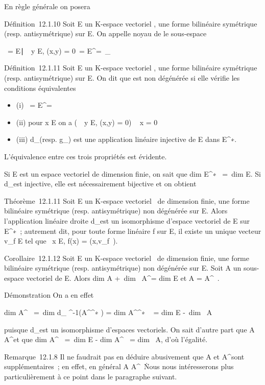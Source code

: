 \documentclass[]{article}
\begin{document}
En règle générale on posera

Définition~12.1.10 Soit E un K-espace vectoriel , \phi une forme bilinéaire
symétrique (resp. antisymétrique) sur E. On appelle noyau de \phi le
sous-espace

\mathrmKer~\phi =
\x \in
E∣\forall~~y \in E, \phi(x,y) =
0\ = E^\bot =\
\mathrmKerd_ \phi

Définition~12.1.11 Soit E un K-espace vectoriel , \phi une forme bilinéaire
symétrique (resp. antisymétrique) sur E. On dit que \phi est non dégénérée
si elle vérifie les conditions équivalentes

\begin{itemize}
\itemsep1pt\parskip0pt
\item
  (i) \mathrmKer~\phi =
  E^\bot = \0\
\item
  (ii) pour x \in E on a \left
  (\forall~~y \in E, \phi(x,y) = 0\right ) \rigtharrow~
  x = 0
\item
  (iii) d_\phi (resp. g_\phi) est une application linéaire
  injective de E dans E^∗.
\end{itemize}

L'équivalence entre ces trois propriétés est évidente.

Si E est un espace vectoriel de dimension finie, on sait que
dim E^∗~ =\
dim E. Si d_\phi est injective, elle est nécessairement
bijective et on obtient

Théorème~12.1.11 Soit E un K-espace vectoriel ~de dimension finie, \phi une
forme bilinéaire symétrique (resp. antisymétrique) non dégénérée sur E.
Alors l'application linéaire droite d_\phi est un isomorphisme
d'espace vectoriel de E sur E^∗~; autrement dit, pour toute
forme linéaire f sur E, il existe un unique vecteur v_f \in E tel
que \forall~x \in E, f(x) = \phi(x,v_f~).

Corollaire~12.1.12 Soit E un K-espace vectoriel ~de dimension finie, \phi
une forme bilinéaire symétrique (resp. antisymétrique) non dégénérée sur
E. Soit A un sous-espace vectoriel de E. Alors
dim A +\ dim~
A^\bot = dim E et A = A^\bot\bot~.

Démonstration On a en effet

dim A^\bot~ =\
dim d_ \phi^-1(A^\bot^∗ )
= dim A^\bot^∗ ~
= dim E -\ dim~ A

puisque d_\phi est un isomorphisme d'espaces vectoriels. On sait
d'autre part que A \subset~ A^\bot\bot et que
dim A^\bot\bot~ =\
dim E - dim A^\bot~
= dim~ A, d'où l'égalité.

Remarque~12.1.8 Il ne faudrait pas en déduire abusivement que A et
A^\bot sont supplémentaires~; en effet, en général A \bigcap
A^\bot\neq~\0\.
Nous nous intéresserons plus particulièrement à ce point dans le
paragraphe suivant.
\end{document}
